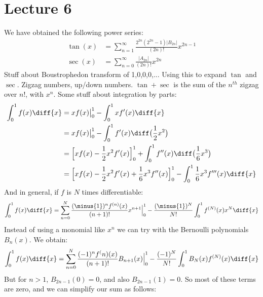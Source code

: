     \section{Lecture 6}
        We have obtained the following power series:
        \begin{align}
            \tan(x)&=\sum_{n=1}^{\infty}
                \frac{2^{2n}(2^{2n}-1)|B_{2n}|}{(2n)!}x^{2n-1}\\
            \sec(x)&=\sum_{n=0}^{\infty}
                \frac{|A_{2n}|}{(2n)!}x^{2n}
        \end{align}
        Stuff about Boustrophedon transform of 1,0,0,0,...
        Using this to expand $\tan$ and $\sec$. Zigzag numbers,
        up/down numbers. $\tan+\sec$ is the sum of the
        $n^{th}$ zigzag over $n!$, with $x^{n}$.
        Some stuff about integration by parts:
        \begin{align}
            \int_{0}^{1}f(x)\diff{x}
            &=xf(x)\big|_{0}^{1}-\int_{0}^{1}xf'(x)\diff{x}\\
            &=xf(x)\big|_{0}^{1}-\int_{0}^{1}
                f'(x)\diff\big(\frac{1}{2}x^{2}\big)\\
            &=\Big[xf(x)-\frac{1}{2}x^{2}f'(x)\Big]_{0}^{1}+
                \int_{0}^{1}f''(x)\diff\big(\frac{1}{6}x^{3}\big)\\
            &=\Big[
                xf(x)-\frac{1}{2}x^{2}f'(x)+\frac{1}{6}x^{3}f''(x)
            \Big]_{0}^{1}-\int_{0}^{1}\frac{1}{6}x^{3}f'''(x)\diff{x}
        \end{align}
        And in general, if $f$ is $N$ times differentiable:
        \begin{equation}
            \int_{0}^{1}f(x)\diff{x}=
            \sum_{n=0}^{N}\frac{(\minus{1})^{n}f^{(n)}(x)}{(n+1)!}x^{n+1}
                \Big|_{0}^{1}-\frac{(\minus{1})^{N}}{N!}\int_{0}^{1}
                    f^{(N)}(x)x^{N}\diff{x}
        \end{equation}
        Instead of using a monomial like $x^{n}$ we can try with the
        Bernoulli polynomials $B_{n}(x)$. We obtain:
        \begin{equation}
            \int_{0}^{1}f(x)\diff{x}=
                \sum_{n=0}^{N}\frac{(-1)^{n}f^(n)(x)}{(n+1)!}B_{n+1}(x)
                \Big|_{0}^{1}-\frac{(-1)^{N}}{N!}\int_{0}^{1}
                B_{N}(x)f^{(N)}(x)\diff{x}
        \end{equation}
        But for $n>1$, $B_{2n-1}(0)=0$, and also
        $B_{2n-1}(1)=0$. So most of these terms are zero, and we can
        simplify our sum as follows:
